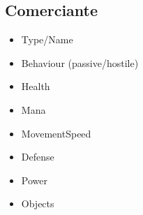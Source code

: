 \subsection{Comerciante}
\begin{itemize}
    \item Type/Name
    \item Behaviour (passive/hostile)
    \item Health
    \item Mana
    \item MovementSpeed
    \item Defense
    \item Power
    \item Objects
\end{itemize}